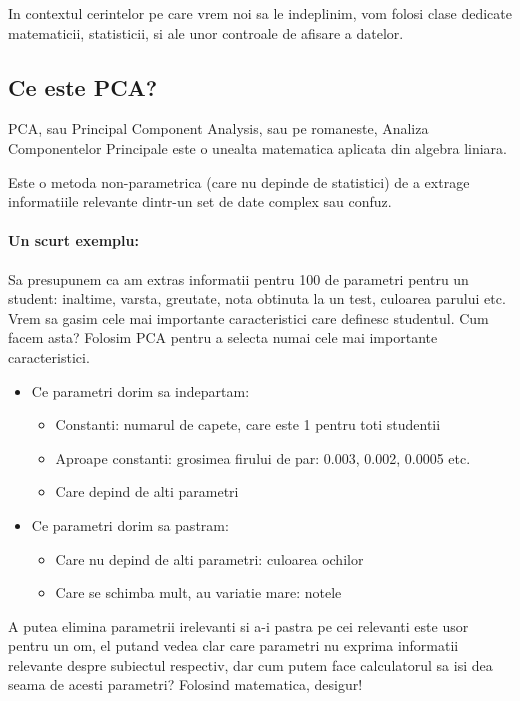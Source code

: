 \documentclass[12pt]{article}
\begin{document}
In contextul cerintelor pe care vrem noi sa le indeplinim, vom folosi clase dedicate matematicii, statisticii, si ale unor controale de afisare a datelor. 

\newpage

\subsection{Ce este PCA?}
PCA, sau Principal Component Analysis, sau pe romaneste, Analiza Componentelor Principale este o unealta matematica aplicata din algebra liniara.

Este o metoda non-parametrica (care nu depinde de statistici) de a extrage informatiile relevante dintr-un set de date complex sau confuz.

\paragraph{Un scurt exemplu: }
Sa presupunem ca am extras informatii pentru 100 de parametri pentru un student: inaltime, varsta, greutate, nota obtinuta la un test, culoarea parului etc. Vrem sa gasim cele mai importante caracteristici care definesc studentul. Cum facem asta? Folosim PCA pentru a selecta numai cele mai importante caracteristici.

\begin{itemize}
	\item Ce parametri dorim sa indepartam:
	\begin{itemize}
	\item Constanti: numarul de capete, care este 1 pentru toti studentii
	\item Aproape constanti: grosimea firului de par: 0.003, 0.002, 0.0005 etc.
	\item Care depind de alti parametri
	\end{itemize}
	\item Ce parametri dorim sa pastram:
	\begin{itemize}
	\item Care nu depind de alti parametri: culoarea ochilor
	\item Care se schimba mult, au variatie mare: notele
	\end{itemize}
\end{itemize}

A putea elimina parametrii irelevanti si a-i pastra pe cei relevanti este usor pentru un om, el putand vedea clar care parametri nu exprima informatii relevante despre subiectul respectiv, dar cum putem face calculatorul sa isi dea seama de acesti parametri? Folosind matematica, desigur!
\end{document}
